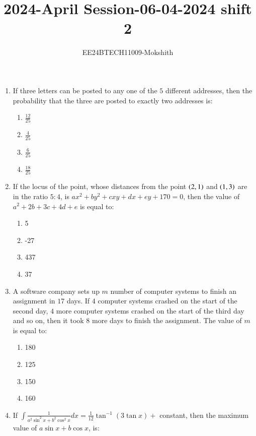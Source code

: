 \documentclass[journal]{IEEEtran}
\begin{document}

\title{2024-April Session-06-04-2024 shift 2}
\author{EE24BTECH11009-Mokshith}
{\let\newpage\relax\maketitle}
\renewcommand{\thefigure}{\theenumi}
\renewcommand{\thetable}{\theenumi}
\setlength{\intextsep}{10pt} %
\renewcommand{\thetable}{\theenumi}
\begin{enumerate}[start=16]
\item If three letters can be posted to any one of the $5 $ different addresses, then the probability that the three are posted to exactly two addresses is:
    \begin{enumerate}
    \item $\frac{12}{25}$
    \item $\frac{4}{25}$
    \item $\frac{6}{25}$
    \item $\frac{18}{25}$
\end{enumerate}
\item If the locus of the point, whose distances from the point $\left(2, 1\right)$ and $\left(1, 3\right)$ are in the ratio $5: 4$, is
$ax^2+by^2+cxy+dx+ey+170=0$, then the value of $a^2+2b+3c+4d+e$ is equal to:
\begin{enumerate}
\item 5
\item -27
\item 437
\item 37
\end{enumerate}
\item A software company sets up $m$ number of computer systems to finish an assignment in $17$ days. If
$4$ computer systems crashed on the start of the second day, $4$ more computer systems crashed on
the start of the third day and so on, then it took $8$ more days to finish the assignment. The value of
$m$ is equal to:
\begin{enumerate}
\item 180
\item 125
\item 150
\item 160
\end{enumerate}
\item If $\int\frac{1}{a^{2}\sin^{2}x+b^{2}\cos^{2}x}dx=\frac{1}{12}\tan^{-1}(3\tan x)+$ constant, then the maximum value of $a\sin x+b\cos x$, is:


\end{enumerate}
\end{document}
